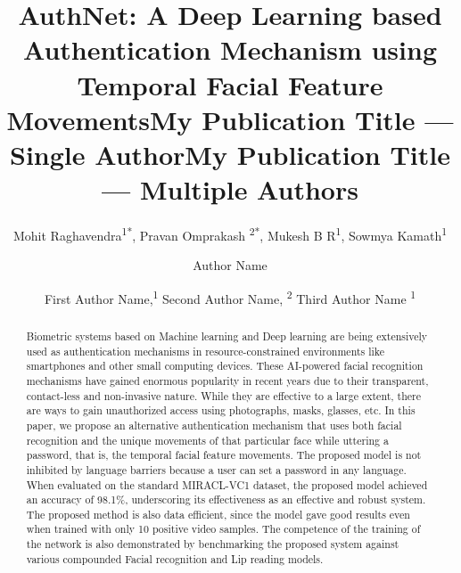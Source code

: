\documentclass[letterpaper]{article}
\title{AuthNet: A Deep Learning based Authentication Mechanism using Temporal Facial Feature Movements}
\author{
    
    Mohit Raghavendra\textsuperscript{\rm 1*},
    Pravan Omprakash \textsuperscript{\rm 2*},
    Mukesh B R\textsuperscript{\rm 1},
    Sowmya Kamath\textsuperscript{\rm 1}
    
    
}
\title{My Publication Title --- Single Author}
\author {
 
    Author Name 
}
\title{My Publication Title --- Multiple Authors}
\author {
First Author Name,\textsuperscript{\rm 1}
    Second Author Name, \textsuperscript{\rm 2}
    Third Author Name \textsuperscript{\rm 1} 
}
\begin{document}
\maketitle

\begin{abstract}
Biometric systems based on Machine learning and Deep learning are being extensively used as authentication mechanisms in resource-constrained environments like smartphones and other small computing devices. These AI-powered facial recognition mechanisms have gained enormous popularity in recent years due to their transparent,  contact-less and non-invasive nature. While they are effective to a large extent, there are ways to gain unauthorized access using photographs, masks, glasses, etc. In this paper, we propose an alternative authentication mechanism that uses both facial recognition and the unique movements of that particular face while uttering a password, that is, the temporal facial feature movements. The proposed model is not inhibited by language barriers because a user can set a password in any language. When evaluated on the standard MIRACL-VC1 dataset, the proposed model achieved an accuracy of 98.1\%, underscoring its effectiveness as an effective and robust system. The proposed method is also data efficient, since the model gave good results even when trained with only 10 positive video samples. The competence of the training of the network is also demonstrated by benchmarking the proposed system against various compounded Facial recognition and Lip reading models.
\end{abstract}
\end{document}
